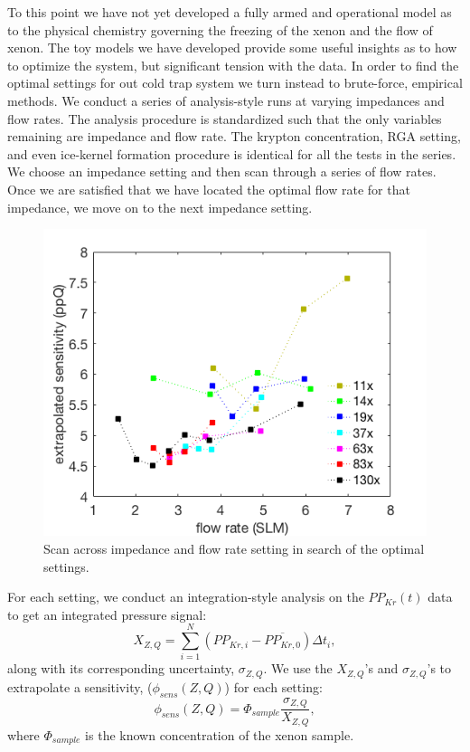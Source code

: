 To this point we have not yet developed a fully armed and operational model as to the physical chemistry governing the freezing of the xenon and the flow of xenon. The toy models we have developed provide some useful insights as to how to optimize the system, but significant tension with the data. In order to find the optimal settings for out cold trap system we turn instead to brute-force, empirical methods. We conduct a series of analysis-style runs at varying impedances and flow rates.  The analysis procedure is standardized such that the only variables remaining are impedance and flow rate. The krypton concentration, RGA setting, and even ice-kernel formation procedure is identical for all the tests in the series. We choose an impedance setting and then scan through a series of flow rates. Once we are satisfied that we have located the optimal flow rate for that impedance, we move on to the next  impedance setting.
\begin{figure}[h]
  \includegraphics[width=\linewidth]{Figures/SLAC_flowimpedance_response_plot.png}
  \caption{Scan across impedance and flow rate setting in search of the optimal settings.}
  \label{fig:sensscan}
\end{figure}

For each setting, we conduct an integration-style analysis on the $PP_{Kr}(t)$ data to get an integrated pressure signal:
\begin{equation}
 X_{Z,Q}=\sum_{i=1}^{N}(PP_{Kr,i}-\overline{PP_{Kr,0}})\Delta t_i,
 \end{equation}
along with its corresponding uncertainty, $\sigma_{Z,Q}$. We use the $X_{Z,Q}$'s and $\sigma_{Z,Q}$'s to extrapolate a sensitivity, ($\phi_{sens}(Z,Q)$) for each setting:
\begin{equation}
\phi_{sens}(Z,Q)=\Phi_{sample}\frac{\sigma_{Z,Q}}{X_{Z,Q}},
\end{equation}
where $\Phi_{sample}$ is the known concentration of the xenon sample. 


